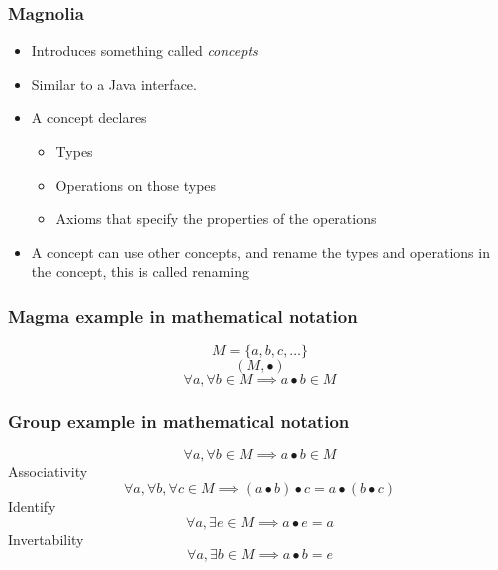 \begin{frame}
  \frametitle{Magnolia}
  \begin{itemize}
    \item Introduces something called \textit{concepts}
    \item Similar to a Java interface.
    \pause
    \item A concept declares
    \begin{itemize}
      \item Types
      \item Operations on those types
      \item Axioms that specify the properties of the operations
    \end{itemize}
    \item A concept can use other concepts, and rename the types and operations
      in the concept, this is called renaming
  \end{itemize}
\end{frame}

\begin{frame}
  \frametitle{Magma example in mathematical notation}
  \begin{equation}
    M = \{ a, b, c, \dots \}
  \end{equation}
  \begin{equation}
    (M, \bullet)
  \end{equation}
  \begin{equation}
    \forall a, \forall b \in M \implies a \bullet b \in M
  \end{equation}
\end{frame}

\begin{frame}
  \frametitle{Group example in mathematical notation}
  \begin{equation}
    \forall a, \forall b \in M \implies a \bullet b \in M
  \end{equation}
  Associativity
  \begin{equation}
    \forall a, \forall b, \forall c \in M \implies
    (a \bullet b) \bullet c = a \bullet (b \bullet c)
  \end{equation}
  Identify
  \begin{equation}
    \forall a, \exists e \in M \implies a \bullet e = a
  \end{equation}
  Invertability
  \begin{equation}
    \forall a, \exists b \in M \implies a \bullet b = e
  \end{equation}
\end{frame}

